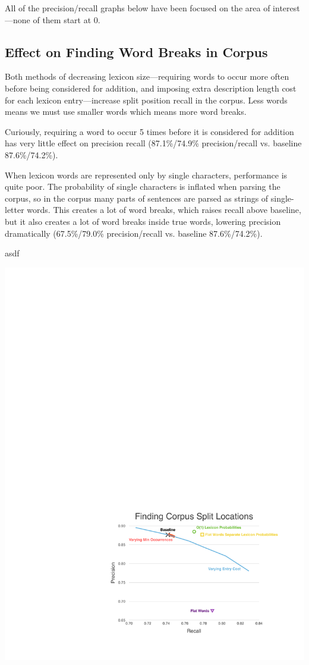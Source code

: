 \documentclass[11pt, oneside, fleqn]{article}
\begin{document}
  All of the precision/recall graphs below have been focused on the area of interest---none of them start at 0.
  
  \subsection{Effect on Finding Word Breaks in Corpus}
  
  Both methods of decreasing lexicon size---requiring words to occur more often before being considered for addition, and imposing extra description length cost for each lexicon entry---increase split position recall in the corpus. Less words means we must use smaller words which means more word breaks.
 
 	Curiously, requiring a word to occur 5 times before it is considered for addition has very little effect on precision recall (87.1\%/74.9\% precision/recall vs. baseline 87.6\%/74.2\%).

	When lexicon words are represented only by single characters, performance is quite poor. The probability of single characters is inflated when parsing the corpus, so in the corpus many parts of sentences are parsed as strings of single-letter words. This creates a lot of word breaks, which raises recall above baseline, but it also creates a lot of word breaks inside true words, lowering precision dramatically (67.5\%/79.0\% precision/recall vs. baseline 87.6\%/74.2\%).

asdf

  \includegraphics{./figure/finding_corpus_split_location.pdf}
\end{document}
